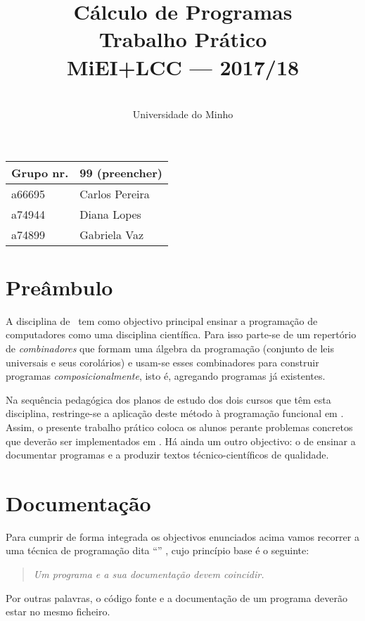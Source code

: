 \documentclass[a4paper]{article}
\title{
       	    Cálculo de Programas
\\
       	Trabalho Prático
\\
       	MiEI+LCC --- 2017/18
}
\author{
       	\dium
\\
       	Universidade do Minho
}
\date\mydate
\begin{document}
\maketitle

\begin{center}\large
\begin{tabular}{ll}
\textbf{Grupo} nr. & 99 (preencher)
\\\hline
a66695 & Carlos Pereira
\\
a74944 & Diana Lopes
\\
a74899 & Gabriela Vaz
\end{tabular}
\end{center}

\section{Preâmbulo}

A disciplina de \CP\ tem como objectivo principal ensinar
a progra\-mação de computadores como uma disciplina científica. Para isso
parte-se de um repertório de \emph{combinadores} que formam uma álgebra da
programação (conjunto de leis universais e seus corolários) e usam-se esses
combinadores para construir programas \emph{composicionalmente}, isto é,
agregando programas já existentes.

Na sequência pedagógica dos planos de estudo dos dois cursos que têm esta
disciplina, restringe-se a aplicação deste método à programação funcional
em \Haskell. Assim,
o presente trabalho prático coloca os alunos perante problemas
concretos que deverão ser implementados em \Haskell.
Há ainda um outro objectivo: o de ensinar a documentar programas e
a produzir textos técnico-científicos de qualidade.

\section{Documentação}
Para cumprir de forma integrada os objectivos enunciados acima vamos recorrer
a uma técnica de programa\-ção dita ``'' \cite{Kn92}, cujo
princípio base é o seguinte:
\begin{quote}\em
Um programa e a sua documentação devem coincidir.
\end{quote}
Por outras palavras, o código fonte e a documentação de um programa deverão estar no
mesmo ficheiro.
\end{document}
